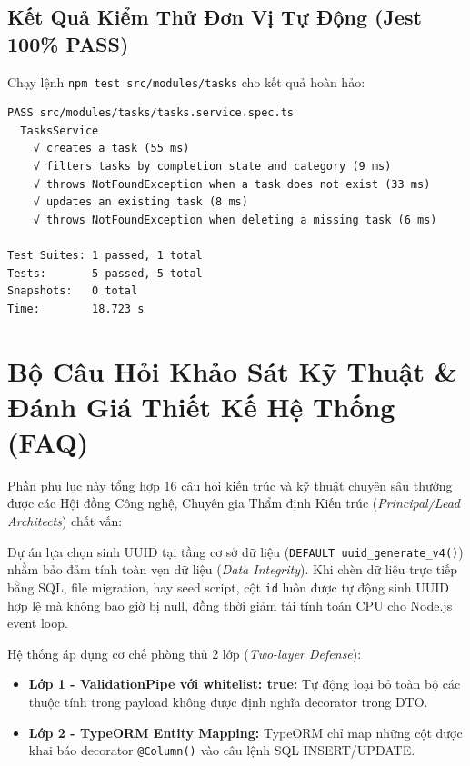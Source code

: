 \documentclass[12pt,a4paper,oneside]{book}
\begin{document}
\section{Kết Quả Kiểm Thử Đơn Vị Tự Động (Jest 100\% PASS)}
Chạy lệnh \texttt{npm test src/modules/tasks} cho kết quả hoàn hảo:
\begin{codebox}
\begin{Verbatim}[fontsize=\small]
PASS src/modules/tasks/tasks.service.spec.ts
  TasksService
    √ creates a task (55 ms)
    √ filters tasks by completion state and category (9 ms)
    √ throws NotFoundException when a task does not exist (33 ms)
    √ updates an existing task (8 ms)
    √ throws NotFoundException when deleting a missing task (6 ms)

Test Suites: 1 passed, 1 total
Tests:       5 passed, 5 total
Snapshots:   0 total
Time:        18.723 s
\end{Verbatim}
\end{codebox}

\chapter{Bộ Câu Hỏi Khảo Sát Kỹ Thuật \& Đánh Giá Thiết Kế Hệ Thống (FAQ)}

Phần phụ lục này tổng hợp 16 câu hỏi kiến trúc và kỹ thuật chuyên sâu thường được các Hội đồng Công nghệ, Chuyên gia Thẩm định Kiến trúc (\textit{Principal/Lead Architects}) chất vấn:

\begin{qnabox}
  Dự án lựa chọn sinh UUID tại tầng cơ sở dữ liệu (\texttt{DEFAULT uuid\_generate\_v4()}) nhằm bảo đảm tính toàn vẹn dữ liệu (\textit{Data Integrity}). Khi chèn dữ liệu trực tiếp bằng SQL, file migration, hay seed script, cột \texttt{id} luôn được tự động sinh UUID hợp lệ mà không bao giờ bị null, đồng thời giảm tải tính toán CPU cho Node.js event loop.
\end{qnabox}

\begin{qnabox}
  Hệ thống áp dụng cơ chế phòng thủ 2 lớp (\textit{Two-layer Defense}):
  \begin{itemize}
    \item \textbf{Lớp 1 - ValidationPipe với whitelist: true:} Tự động loại bỏ toàn bộ các thuộc tính trong payload không được định nghĩa decorator trong DTO.
    \item \textbf{Lớp 2 - TypeORM Entity Mapping:} TypeORM chỉ map những cột được khai báo decorator \texttt{@Column()} vào câu lệnh SQL INSERT/UPDATE.
  \end{itemize}
\end{qnabox}
\end{document}
